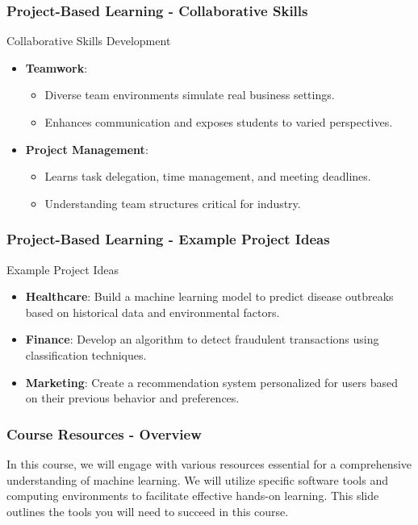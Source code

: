 \documentclass[aspectratio=169]{beamer}
\begin{document}
\begin{frame}[fragile]
    \frametitle{Project-Based Learning - Collaborative Skills}
    \begin{block}{Collaborative Skills Development}
        \begin{itemize}
            \item \textbf{Teamwork}:
            \begin{itemize}
                \item Diverse team environments simulate real business settings.
                \item Enhances communication and exposes students to varied perspectives.
            \end{itemize}
            \item \textbf{Project Management}:
            \begin{itemize}
                \item Learns task delegation, time management, and meeting deadlines.
                \item Understanding team structures critical for industry.
            \end{itemize}
        \end{itemize}
    \end{block}
\end{frame}

\begin{frame}[fragile]
    \frametitle{Project-Based Learning - Example Project Ideas}
    \begin{block}{Example Project Ideas}
        \begin{itemize}
            \item \textbf{Healthcare}: Build a machine learning model to predict disease outbreaks based on historical data and environmental factors.
            \item \textbf{Finance}: Develop an algorithm to detect fraudulent transactions using classification techniques.
            \item \textbf{Marketing}: Create a recommendation system personalized for users based on their previous behavior and preferences.
        \end{itemize}
    \end{block}
\end{frame}

\begin{frame}
    \frametitle{Course Resources - Overview}
    In this course, we will engage with various resources essential for a comprehensive understanding of machine learning. 
    We will utilize specific software tools and computing environments to facilitate effective hands-on learning. 
    This slide outlines the tools you will need to succeed in this course.
\end{frame}
\end{document}
